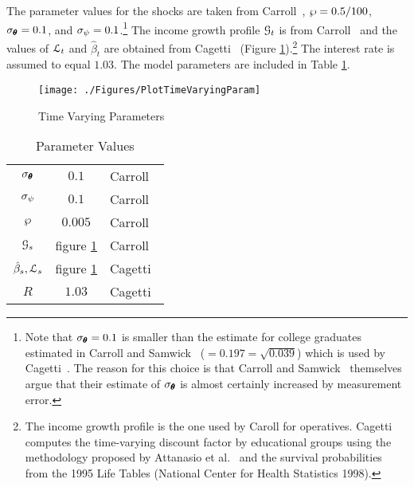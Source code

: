 \documentclass[titlepage, headings=optiontotocandhead]{Resources/texmf-local/tex/latex/econtex}
\begin{document}
The parameter values for the shocks are taken from Carroll~\citeyearpar{carroll:brookings}, $\wp=0.5/100$, $\sigma _{\pmb{\theta} }=0.1$, and $\sigma_{\psi}=0.1$.\footnote{Note that $\sigma _{\pmb{\theta}}=0.1$ is smaller than the estimate for college graduates estimated in
  Carroll and Samwick~\citeyearpar{carroll&samwick:nature} ($=0.197=\sqrt{0.039}$) which is used by Cagetti~\citeyearpar{cagettiWprofiles}. The reason for this choice is that Carroll and Samwick~\citeyearpar{carroll&samwick:nature} themselves argue that their estimate of $\sigma_{\pmb{\theta} }$ is almost certainly increased by measurement error.} The income growth profile $\mathcal{G}_{t}$ is from Carroll~\citeyearpar{carrollBSLCPIH} and the values of $\mathcal{L}_{t}$ and $\hat{\beta}_{t}$ are obtained from Cagetti~\citeyearpar{cagettiWprofiles} (Figure \ref{fig:TimeVaryingParam}).\footnote{The income growth profile is the one used by Caroll for operatives. Cagetti computes the time-varying discount factor by educational groups using the methodology proposed by Attanasio et al.~\citeyearpar{AttanasioBanksMeghirWeber} and the survival probabilities from the 1995 Life Tables (National Center for Health Statistics 1998).} The interest rate is assumed to equal $1.03$. The model parameters are included in Table \ref{table:StrEstParams}.

\hypertarget{PlotTimeVaryingParam}{}
\begin{figure}[h]
  \texttt{[image: ./Figures/PlotTimeVaryingParam]}
  \caption{Time Varying Parameters}
  \label{fig:TimeVaryingParam}
\end{figure}

\begin{table}[h]
  \caption{Parameter Values}\label{table:StrEstParams}
  \begin{center}
    \begin{tabular}{ccl}
      \hline\hline
      $\sigma _{\pmb{\theta}}$    & $0.1$ & Carroll~\citeyearpar{carroll:brookings}
      \\ $\sigma _{\psi}$   & $0.1$ & Carroll~\citeyearpar{carroll:brookings}
      \\ $\wp$           & $0.005$  & Carroll~\citeyearpar{carroll:brookings}
      \\ $\mathcal{G}_{s}$        & figure \ref{fig:TimeVaryingParam} & Carroll~\citeyearpar{carrollBSLCPIH}
      \\ $\hat{\beta}_{s},\mathcal{L}_{s}$ & figure \ref{fig:TimeVaryingParam} & Cagetti~\citeyearpar{cagettiWprofiles}
      \\$R$            & $1.03$  & Cagetti~\citeyearpar{cagettiWprofiles}\\
      \hline
    \end{tabular}
  \end{center}
\end{table}
\end{document}
